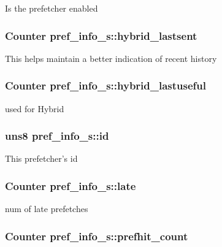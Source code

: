 \label{structpref__info__s_a76baaa162c64c556fad1f2f07cc11767}
Is the prefetcher enabled \hypertarget{structpref__info__s_a2e6f9ffea31a7a3dcb4b23d36b857dae}{
\subsubsection[{hybrid\_\-lastsent}]{\setlength{\rightskip}{0pt plus 5cm}Counter {\bf pref\_\-info\_\-s::hybrid\_\-lastsent}}}
\label{structpref__info__s_a2e6f9ffea31a7a3dcb4b23d36b857dae}
This helps maintain a better indication of recent history \hypertarget{structpref__info__s_a82eadd56d553c03fafdc8fa1349ee47d}{
\subsubsection[{hybrid\_\-lastuseful}]{\setlength{\rightskip}{0pt plus 5cm}Counter {\bf pref\_\-info\_\-s::hybrid\_\-lastuseful}}}
\label{structpref__info__s_a82eadd56d553c03fafdc8fa1349ee47d}
used for Hybrid \hypertarget{structpref__info__s_aa751364dd397a33cd7ffdea42cbda8c0}{
\subsubsection[{id}]{\setlength{\rightskip}{0pt plus 5cm}uns8 {\bf pref\_\-info\_\-s::id}}}
\label{structpref__info__s_aa751364dd397a33cd7ffdea42cbda8c0}
This prefetcher's id \hypertarget{structpref__info__s_a2a55ea02b1cd31145a910e43a5ab74c0}{
\subsubsection[{late}]{\setlength{\rightskip}{0pt plus 5cm}Counter {\bf pref\_\-info\_\-s::late}}}
\label{structpref__info__s_a2a55ea02b1cd31145a910e43a5ab74c0}
num of late prefetches \hypertarget{structpref__info__s_a84a8db7783a6a9ae781fc5e5ee66b9da}{
\subsubsection[{prefhit\_\-count}]{\setlength{\rightskip}{0pt plus 5cm}Counter {\bf pref\_\-info\_\-s::prefhit\_\-count}}}
